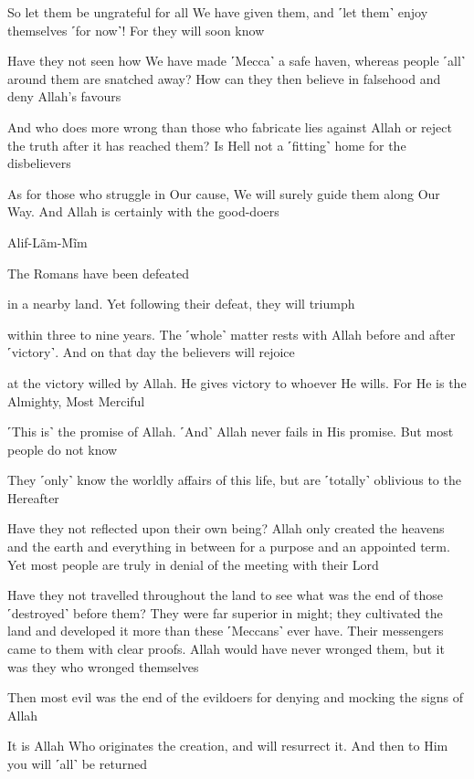So let them be ungrateful for all We have given them, and ˹let them˺ enjoy themselves ˹for now˺! For they will soon know

Have they not seen how We have made ˹Mecca˺ a safe haven, whereas people ˹all˺ around them are snatched away? How can they then believe in falsehood and deny Allah’s favours

And who does more wrong than those who fabricate lies against Allah or reject the truth after it has reached them? Is Hell not a ˹fitting˺ home for the disbelievers

As for those who struggle in Our cause, We will surely guide them along Our Way. And Allah is certainly with the good-doers

Alif-Lãm-Mĩm

The Romans have been defeated

in a nearby land. Yet following their defeat, they will triumph

within three to nine years. The ˹whole˺ matter rests with Allah before and after ˹victory˺. And on that day the believers will rejoice

at the victory willed by Allah. He gives victory to whoever He wills. For He is the Almighty, Most Merciful

˹This is˺ the promise of Allah. ˹And˺ Allah never fails in His promise. But most people do not know

They ˹only˺ know the worldly affairs of this life, but are ˹totally˺ oblivious to the Hereafter

Have they not reflected upon their own being? Allah only created the heavens and the earth and everything in between for a purpose and an appointed term. Yet most people are truly in denial of the meeting with their Lord

Have they not travelled throughout the land to see what was the end of those ˹destroyed˺ before them? They were far superior in might; they cultivated the land and developed it more than these ˹Meccans˺ ever have. Their messengers came to them with clear proofs. Allah would have never wronged them, but it was they who wronged themselves

Then most evil was the end of the evildoers for denying and mocking the signs of Allah

It is Allah Who originates the creation, and will resurrect it. And then to Him you will ˹all˺ be returned

